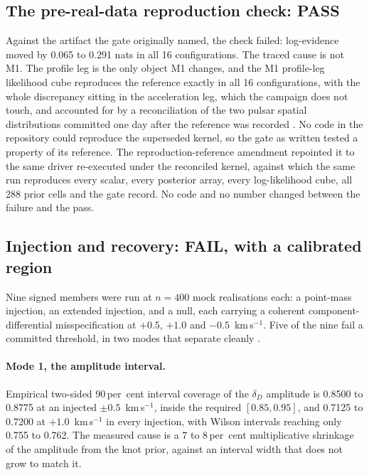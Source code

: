 \documentclass[11pt]{article}
\newcommand{\dD}{\ensuremath{\delta_D}}
\begin{document}
\subsection{The pre-real-data reproduction check: PASS}
\label{sec:gates-f}

Against the artifact the gate originally named, the check failed: log-evidence moved by 0.065 to 0.291 nats in all 16 configurations. The traced cause is not M1. The profile leg is the only object M1 changes, and the M1 profile-leg likelihood cube reproduces the reference exactly in all 16 configurations, with the whole discrepancy sitting in the acceleration leg, which the campaign does not touch, and accounted for by a reconciliation of the two pulsar spatial distributions committed one day after the reference was recorded \citep{AXIGatesReport2026}. No code in the repository could reproduce the superseded kernel, so the gate as written tested a property of its reference. The reproduction-reference amendment repointed it to the same driver re-executed under the reconciled kernel, against which the same run reproduces every scalar, every posterior array, every log-likelihood cube, all 288 prior cells and the gate record. No code and no number changed between the failure and the pass.

\subsection{Injection and recovery: FAIL, with a calibrated region}
\label{sec:gates-a}

Nine signed members were run at $n = 400$ mock realisations each: a point-mass injection, an extended injection, and a null, each carrying a coherent component-differential misspecification at $+0.5$, $+1.0$ and $-0.5$~km\,s$^{-1}$. Five of the nine fail a committed threshold, in two modes that separate cleanly \citep{AXIGatesReport2026}.

\paragraph{Mode 1, the amplitude interval.} Empirical two-sided 90\,per~cent interval coverage of the \dD{} amplitude is 0.8500 to 0.8775 at an injected $\pm0.5$~km\,s$^{-1}$, inside the required $[0.85, 0.95]$, and 0.7125 to 0.7200 at $+1.0$~km\,s$^{-1}$ in every injection, with Wilson intervals reaching only 0.755 to 0.762. The measured cause is a 7 to 8\,per~cent multiplicative shrinkage of the amplitude from the knot prior, against an interval width that does not grow to match it.
\end{document}
